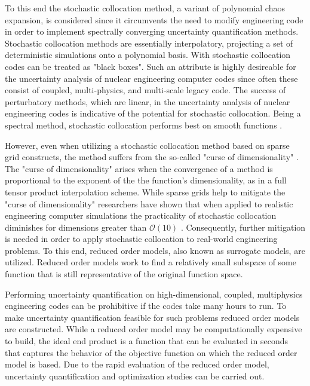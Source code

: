 To this end the stochastic collocation method, a variant of polynomial chaos expansion, is considered since it circumvents the need to modify engineering code in order to implement spectrally converging uncertainty quantification methods. Stochastic collocation methods are essentially interpolatory, projecting a set of deterministic simulations onto a polynomial basis. With stochastic collocation codes can be treated as "black boxes". Such an attribute is highly desireable for the uncertainty analysis of nuclear engineering computer codes since often these consist of coupled, multi-physics, and multi-scale legacy code. The success of perturbatory methods, which are linear, in the uncertainty analysis of nuclear engineering codes is indicative of the potential for stochastic collocation. Being a spectral method, stochastic collocation performs best on smooth functions \cite{BoydSpec}.    

However, even when utilizing a stochastic collocation method based on sparse grid constructs, the method suffers from the so-called "curse of dimensionality" \cite{LeMaitreKnio}. The "curse of dimensionality" arises when the convergence of a method is proportional to the exponent of the the function's dimensionality, as in a full tensor product interpolation scheme. While sparse grids help to mitigate the "curse of dimensionality" researchers have shown that when applied to realistic engineering computer simulations the practicality of stochastic collocation diminishes for dimensions greater than $\mathcal{O}(10)$ \cite{AHSGC_HighDimensions}. Consequently, further mitigation is needed in order to apply stochastic collocation to real-world engineering problems. To this end, reduced order models, also known as surrogate models, are utilized. Reduced order models work to find a relatively small subspace of some function that is still representative of the original function space. 

Performing uncertainty quantification on high-dimensional, coupled, multiphysics engineering codes can be prohibitive if the codes take many hours to run. To make uncertainty quantification feasible for such problems reduced order models are constructed. While a reduced order model may be computationally expensive to build, the ideal end product is a function that can be evaluated in seconds that captures the behavior of the objective function on which the reduced order model is based. Due to the rapid evaluation of the reduced order model, uncertainty quantification and optimization studies can be carried out. 

